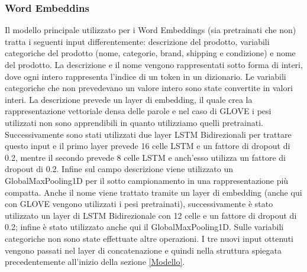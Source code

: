 \subsubsection{Word Embeddins}
Il modello principale utilizzato per i Word Embeddings (sia pretrainati che non) tratta i seguenti input differentemente: descrizione del prodotto, variabili categoriche del prodotto (nome, categorie, brand, shipping e condizione) e nome del prodotto.
La descrizione e il nome vengono rappresentati sotto forma di interi, dove ogni intero rappresenta l'indice di un token in un dizionario.
Le variabili categoriche che non prevedevano un valore intero sono state convertite in valori interi.
La descrizione prevede un layer di embedding, il quale crea la rappresentazione vettoriale densa delle parole e nel caso di GLOVE i pesi utilizzati non sono apprendibili in quanto utilizziamo quelli pretrainati.
Successivamente sono stati utilizzati due layer LSTM Bidirezionali per trattare questo input e il primo layer prevede 16 celle LSTM e un fattore di dropout di 0.2, mentre il secondo prevede 8 celle LSTM e anch'esso utilizza un fattore di dropout di 0.2.
Infine sul campo descrizione viene utilizzato un GlobalMaxPooling1D per il sotto campionamento in una rappresentazione più compatta.
Anche il nome viene trattato tramite un layer di embedding (anche qui con GLOVE vengono utilizzati i pesi pretrainati), successivamente è stato utilizzato un layer di LSTM Bidirezionale con 12 celle e un fattore di dropout di 0.2; infine è stato utilizzato anche qui il GlobalMaxPooling1D.
Sulle variabili categoriche non sono state effettuate altre operazioni.
I tre nuovi input ottenuti vengono passati nel layer di concatenazione e quindi nella struttura spiegata precedentemente all'inizio della sezione \ref{Modello}.




